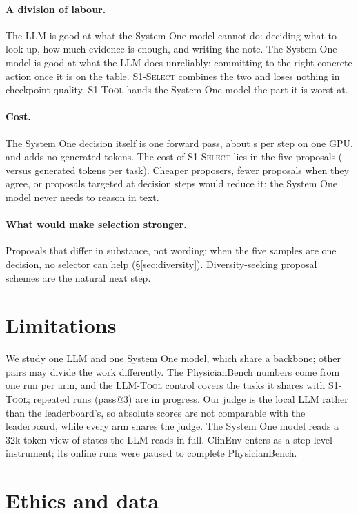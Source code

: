 \documentclass[11pt]{article}
\newcommand{\sel}{\textsc{S1-Select}}
\newcommand{\tool}{\textsc{S1-Tool}}
\newcommand{\ctl}{\textsc{LLM-Tool}}
\begin{document}
\paragraph{A division of labour.} The LLM is good at what the System One model cannot do: deciding what to look up,
how much evidence is enough, and writing the note. The System One model is good at what the LLM does unreliably:
committing to the right concrete action once it is on the table. \sel{} combines the two and loses nothing in
checkpoint quality. \tool{} hands the System One model the part it is worst at.

\paragraph{Cost.} The System One decision itself is one forward pass, about \DECSels{} s per step on one GPU, and adds
no generated tokens. The cost of \sel{} lies in the five proposals (\TOKSel{} versus \TOKLLM{} generated tokens per
task). Cheaper proposers, fewer proposals when they agree, or proposals targeted at decision steps would reduce it;
the System One model never needs to reason in text.

\paragraph{What would make selection stronger.} Proposals that differ in substance, not wording: when the five
samples are one decision, no selector can help (\S\ref{sec:diversity}). Diversity-seeking proposal schemes are the
natural next step.

\section*{Limitations}

We study one LLM and one System One model, which share a backbone; other pairs may divide the work differently. The
PhysicianBench numbers come from one run per arm, and the \ctl{} control covers the \PRToolCtln{} tasks it shares with
\tool; repeated runs (pass@3) are in progress. Our judge is the local LLM rather than the
leaderboard's, so absolute scores are not comparable with the leaderboard, while every arm shares the judge. The System
One model reads a 32k-token view of states the LLM reads in full. ClinEnv enters as a step-level instrument; its
online runs were paused to complete PhysicianBench.

\section*{Ethics and data}\label{sec:ethics}
\end{document}
